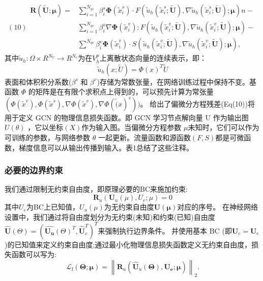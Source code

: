 $$(10)\begin{aligned}
    \boldsymbol{R}(\tilde{\boldsymbol{U}} ; \boldsymbol{\mu})= & \sum_{i=1}^{N_{q s}} \beta_{i}^{s} \boldsymbol{\Phi}\left(\tilde{x}_{i}^{s}\right) \cdot F\left(\tilde{u}_{h}\left(\tilde{x}_{i}^{s} ; \tilde{\boldsymbol{U}}\right), \nabla \tilde{u}_{h}\left(\tilde{x}_{i}^{s} ; \tilde{\boldsymbol{U}}\right) ; \boldsymbol{\mu}\right) n- \\
    & \sum_{i=1}^{N_{q v}} \beta_{i}^{v} \nabla \boldsymbol{\Phi}\left(\tilde{x}_{i}^{v}\right): F\left(\tilde{u}_{h}\left(\tilde{x}_{i}^{v} ; \tilde{\boldsymbol{U}}\right), \nabla \tilde{u}_{h}\left(\tilde{x}_{i}^{v} ; \tilde{\boldsymbol{U}}\right) ; \boldsymbol{\mu}\right)- \\
    & \sum^{N_{q v}} \beta_{i}^{v} \boldsymbol{\Phi}\left(\tilde{x}_{i}^{v}\right) \cdot S\left(\tilde{u}_{h}\left(\tilde{x}_{i}^{v} ; \tilde{\boldsymbol{U}}\right), \nabla \tilde{u}_{h}\left(\tilde{x}_{i}^{v} ; \tilde{\boldsymbol{U}}\right) ; \boldsymbol{\mu}\right),
\end{aligned}$$
其中$\tilde{u}_h:\Omega\times R^{N_U}\rightarrow R^{N_c}$为在$V_h^p$上离散状态向量的连续表示，即：
$$\tilde{u}_h(x;\tilde{U})=\Phi(x)^T\tilde{U}$$
表面和体积积分系数($\beta^s$ 和 $\beta^v$)存储为常数张量，在网络训练过程中保持不变。基函数 $\Phi$ 的矩阵是在有限个求积点上得到的，可以预先计算为常张量$(\Phi(\tilde{x}^v), \Phi(\tilde{x}^s),\nabla\Phi(\tilde{x}^v),\nabla\Phi (\tilde(x)^s))$。
给出了偏微分方程残差(Eq(10))将用于定义 GCN 的物理信息损失函数。即 GCN 学习节点解向量 U 作为输出图 $U(\theta)$ ，它以坐标$(X)$作为输入图。当偏微分方程参数 $\mu$未知时，它们可以作为可训练的参数，与网络参数 $\theta$ 一起更新。流量函数和源函数$(F,S)$都是可微函数，梯度信息可以从输出传播到输入。表1总结了这些注释。

\subsubsection{必要的边界约束}
我们通过限制无约束自由度，即原理必要的BC来施加约束:
$$\boldsymbol{R}_u(\boldsymbol{U}_u(\mu),U_e;\mu)=0$$
其中$U_e$为BC上已知值，$U_u(\mu)$为无约束自由度$\boldsymbol{U}(\boldsymbol{\mu})$对应的序号。
在神经网络设置中，我们通过将自由度划分为无约束(未知)和约束(已知)自由度$\hat{\boldsymbol{U}}(\Theta)=(\hat{\boldsymbol{U_u}}(\Theta)^T,\hat{\boldsymbol{U}}_c^T)^T$来强制执行边界条件。
并使用基本 BC (即$ \boldsymbol{U}_c = \boldsymbol{U}_e$)的已知值来定义约束自由度;通过最小化物理信息损失函数定义无约束自由度，损失函数可以写为:
$$\mathcal{L}_{\mathrm{f}}(\boldsymbol{\Theta} ; \boldsymbol{\mu})=\left\|\boldsymbol{R}_{u}\left(\hat{\boldsymbol{U}}_{u}(\boldsymbol{\Theta}), \boldsymbol{U}_{\boldsymbol{e}} ; \boldsymbol{\mu}\right)\right\|_{2} .$$

